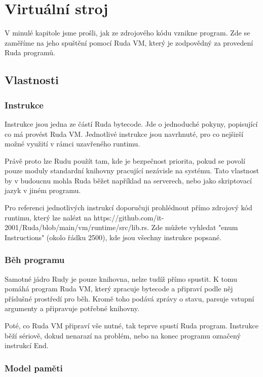 \documentclass[12pt, a4paper,
twoside,        %
openright
]{report}
\let\oldchapter\chapter
\renewcommand{\chapter}{
	\clearpage
	\pagestyle{fancy}
	\oldchapter
}
\begin{document}
\chapter{Virtuální stroj}

V minulé kapitole jsme prošli, jak ze zdrojového kódu vznikne program. Zde se zaměříme na jeho spuštění pomocí Ruda VM, který je zodpovědný za provedení Ruda programů.

\section{Vlastnosti}

\subsection{Instrukce}

Instrukce jsou jedna ze částí Ruda bytecode. Jde o jednoduché pokyny, popisující co má provést Ruda VM. Jednotlivé instrukce jsou navrhnuté, pro co nejširší možné využití v rámci uzavřeného runtimu. 

Právě proto lze Rudu použít tam, kde je bezpečnost priorita, pokud se povolí pouze moduly standardní knihovny pracující nezávisle na systému. Tato vlastnost by v budoucnu mohla Ruda běžet například na serverech, nebo jako skriptovací jazyk v jiném programu.

Pro referenci jednotlivých instrukcí doporučuji prohlédnout přímo zdrojový kód runtimu, který lze nalézt na https://github.com/it-2001/Ruda/blob/main/vm/runtime/src/lib.rs. Zde můžete vyhledat "enum Instructions" (okolo řádku 2500), kde jsou všechny instrukce popsané.

\subsection{Běh programu}

Samotné jádro Rudy je pouze knihovna, nelze tudíž přímo spustit. K tomu pomáhá program Ruda VM, který zpracuje bytecode a připraví podle něj příslušné prostředí pro běh. Kromě toho podává zprávy o stavu, parsuje vstupní argumenty a připravuje potřebné knihovny.

Poté, co Ruda VM připraví vše nutné, tak teprve spustí Ruda program. Instrukce běží sériově, dokud nenarazí na problém, nebo na konec programu označený instrukcí End.

\clearpage
\subsection{Model paměti}
\end{document}
